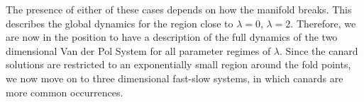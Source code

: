 The presence of either of these cases depends on how the manifold breaks.
This describes the global dynamics for the region close to $\lambda =0$, $\lambda=2$.
Therefore, we are now in the position to have a description of the full dynamics of the two dimensional Van der Pol System for all parameter regimes of $\lambda$.
Since the canard solutions are restricted to an exponentially small region around the fold points, we now move on to three dimensional fast-slow systems, in which canards are more common occurrences.




























